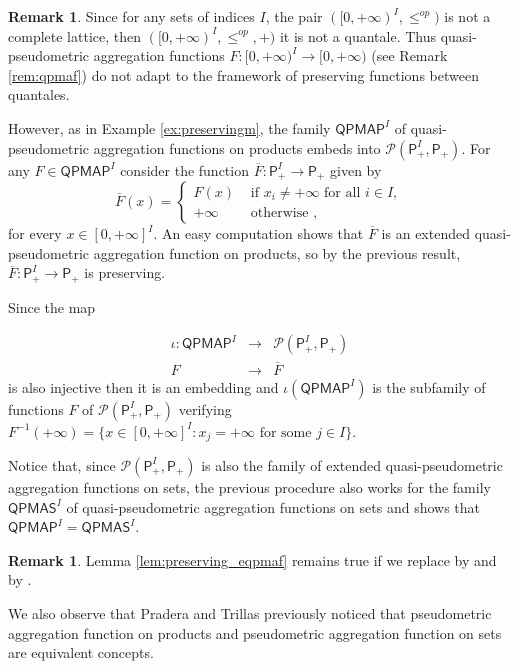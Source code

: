 \documentclass[11pt,a4paper]{amsart}
\theoremstyle{definition}
\newtheorem{remark}[theorem]{Remark}
\begin{document}
	
	
	\begin{remark}\label{rem:extended}
		Since for any sets of indices $I$, the pair $([0,+\infty)^I,\leq^{op})$ is not a complete lattice, then $([0,+\infty)^I,\leq^{op},+)$ it is not a quantale. Thus quasi-pseudometric aggregation functions $F:[0,+\infty)^I\to [0,+\infty)$ (see Remark \ref{rem:qpmaf}) do not adapt to the framework of preserving functions between quantales. 
		
		However, as in Example \ref{ex:preservingm}, the family $\mathsf{QPMAP}^I$ of quasi-pseudometric aggregation functions on products embeds into $\mathscr{P}(\mathsf{P}_+^I,\mathsf{P}_+)$. For any $F\in \mathsf{QPMAP}^I$
		consider the function $\overline{F}:\mathsf{P}_+^I\to \mathsf{P}_+$ given by
		$$\overline{F}(x)=\begin{cases}
			F(x)&\text{ if }x_i\neq +\infty\text{ for all }i\in I,\\
			+\infty&\text{ otherwise },
		\end{cases}$$
		for every $x\in [0,+\infty]^I.$ An easy computation shows that $\overline{F}$ is an extended quasi-pseudometric aggregation function on products, so by the previous result, $\overline{F}:\mathsf{P}_+^I\to \mathsf{P}_+$ is preserving.
		
		Since the map
		
		$$\begin{array}{ccc}
			
			\iota:\mathsf{QPMAP}^I&\to&\mathscr{P}(\mathsf{P}_+^I,\mathsf{P}_+)\\[5pt]
			F&\to&\overline{F}
		\end{array}$$
		is also injective then it is an embedding and $\iota(\mathsf{QPMAP}^I)$ is the subfamily of functions $F$ of $\mathscr{P}(\mathsf{P}_+^I,\mathsf{P}_+)$ verifying 
		$F^{-1}(+\infty)=\{x\in [0,+\infty]^I:x_j=+\infty\text{ for some }j\in I\}.$ 
		
		Notice that, since $\mathscr{P}(\mathsf{P}_+^I,\mathsf{P}_+)$ is also the family of extended quasi-pseudometric aggregation functions on sets, the previous procedure also works for the family $\mathsf{QPMAS}^I$ of quasi-pseudometric aggregation functions on sets and shows that $\mathsf{QPMAP}^I=\mathsf{QPMAS}^I.$
	\end{remark}
	
	\begin{remark}\label{rem:spreserving_epmaf}
		Lemma \ref{lem:preserving_eqpmaf} remains true if we replace  by  and  by . 
		
		We also observe that Pradera and Trillas \cite{PraTri02} previously noticed that pseudometric aggregation function on products and pseudometric aggregation function on sets are equivalent concepts. 
	\end{remark}
	
\end{document}

